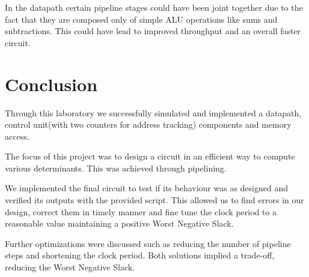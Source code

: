 \documentclass[12pt]{article}
\begin{document}
In the datapath certain pipeline stages could have been joint together due to the fact that they are composed only of simple ALU operations like sums and subtractions. This could have lead to improved throughput and an overall faster circuit.

\section{Conclusion}
Through this laboratory we successfully simulated and implemented a datapath, control unit(with two counters for address tracking) components and memory access.

The focus of this project was to design a circuit in an efficient way to compute various determinants. This was achieved through pipelining.
  
We implemented the final circuit to test if its behaviour was as designed and verified its outputs with the provided script. This allowed us to
find errors in our design, correct them in timely manner and fine tune the clock period to a reasonable value maintaining a positive Worst Negative Slack.

Further optimizations were discussed such as reducing the number of pipeline steps and shortening the clock period. Both solutions implied a trade-off, reducing the Worst Negative Slack.

\printbibliography
\end{document}
